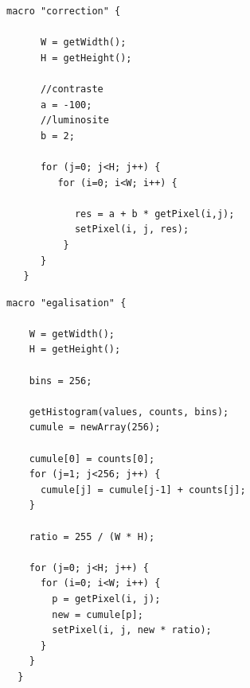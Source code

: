 \documentclass[a4paper,11pt]{article}
\begin{document}
  \begin{lstlisting}[caption=Macro de la correction affine]
   macro "correction" {

      W = getWidth();
      H = getHeight();

      //contraste
      a = -100;
      //luminosite
      b = 2;

      for (j=0; j<H; j++) {
         for (i=0; i<W; i++) {

            res = a + b * getPixel(i,j);
            setPixel(i, j, res);
          }
      }
   }
  \end{lstlisting}
  
  \begin{lstlisting}[caption=Macro de l'égalisation de l'histogramme]
  macro "egalisation" {

    W = getWidth();
    H = getHeight();

    bins = 256;

    getHistogram(values, counts, bins);
    cumule = newArray(256);

    cumule[0] = counts[0];
    for (j=1; j<256; j++) {
      cumule[j] = cumule[j-1] + counts[j];
    }

    ratio = 255 / (W * H);

    for (j=0; j<H; j++) {
      for (i=0; i<W; i++) {
        p = getPixel(i, j);
        new = cumule[p];
        setPixel(i, j, new * ratio);
      }
    }
  }
  \end{lstlisting}

    
\end{document}
